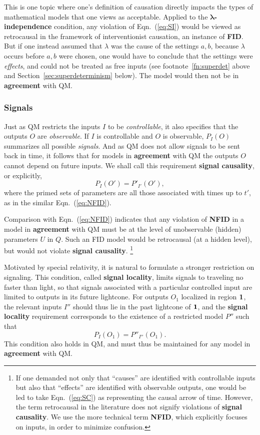 \documentclass[onecolumn, nofootinbib, 12pt]{revtex4-1}
\newcommand{\eq}[1]{{Eqn.~(\ref{#1})}}
\begin{document}
This is one topic where one's definition of causation directly impacts the types of mathematical models that one views as acceptable.  Applied to the {\bf $\bm{\lambda}$-independence} condition, any violation of \eq{eq:SI} would be viewed as retrocausal in the framework of interventionist causation, an instance of {\bf FID}.  But if one instead assumed that $\lambda$ was the cause of the settings $a,b$, because $\lambda$ occurs before $a,b$ were chosen, one would have to conclude that the settings were \emph{effects}, and could not be treated as free inputs (see footnote~\ref{fn:superdet} above and Section~\ref{sec:superdeterminism} below).  The model would then not be in {\bf agreement} with QM.

\subsubsection{Signals}

Just as QM restricts the inputs $I$ to be {\em controllable}, it also specifies that the outputs $O$ are {\em observable}.  If $I$ is controllable and $O$ is observable, $P_I(O)$ summarizes all possible {\em signals}.  And as QM does not allow signals to be sent back in time, it follows that for models in {\bf agreement} with QM the outputs $O$ cannot depend on future inputs.  We shall call this requirement {\bf signal causality}, or explicitly,
\begin{equation}
\label{eq:SC}
P_I(O')=P'_{I'}(O'),
\end{equation} 
where the primed sets of parameters are all those associated with times up to $t'$, as in the similar Eqn.~(\ref{eq:NFID}).  

Comparison with Eqn.~(\ref{eq:NFID}) indicates that any violation of {\bf NFID} in a model in {\bf agreement} with QM must be at the level of unobservable (hidden) parameters $U$ in $Q$.  Such an FID model would be retrocausal (at a hidden level), but would not violate {\bf signal causality}.%
\footnote{
If one demanded not only that ``causes'' are identified with controllable inputs but also that ``effects'' are identified with observable outputs, one would be led to take \eq{eq:SC} as representing the causal arrow of time.  However, the term retrocausal in the literature does not signify violations of {\bf signal causality}.  We use the more technical term {\bf NFID}, which explicitly focuses on inputs, in order to minimize confusion.}

Motivated by special relativity, it is natural to formulate a stronger restriction on signaling.  This condition, called {\bf signal locality}, limits signals to traveling no faster than light, so that signals associated with a particular controlled input are limited to outputs in its future lightcone.  For outputs $O_1$ localized in region $\bf{1}$, the relevant inputs $I''$ should thus lie in the past lightcone of $\bf{1}$, and the {\bf signal locality} requirement corresponds to the existence of a restricted model $P''$ such that
\begin{equation}
\label{eq:SL}
P_I(O_1)=P''_{I''}(O_1).
\end{equation}
This condition also holds in QM, and must thus be maintained for any model in {\bf agreement} with QM.
\end{document}
